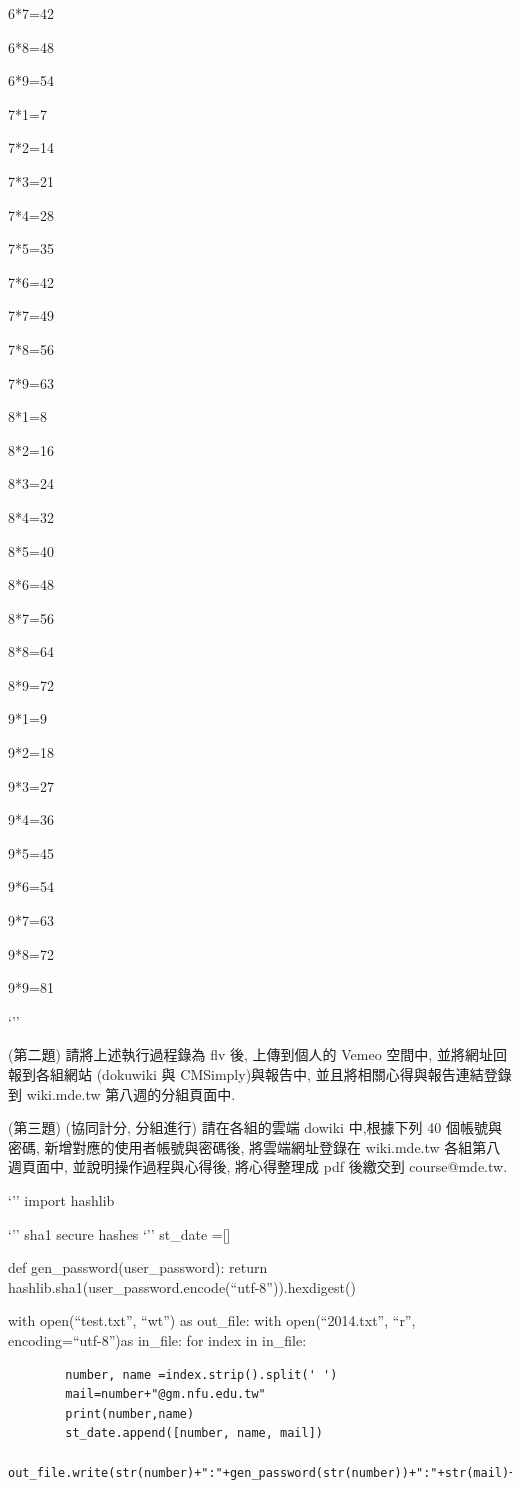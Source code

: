 \documentclass[]{article}
\begin{document}
6*7=42

6*8=48

6*9=54

7*1=7

7*2=14

7*3=21

7*4=28

7*5=35

7*6=42

7*7=49

7*8=56

7*9=63

8*1=8

8*2=16

8*3=24

8*4=32

8*5=40

8*6=48

8*7=56

8*8=64

8*9=72

9*1=9

9*2=18

9*3=27

9*4=36

9*5=45

9*6=54

9*7=63

9*8=72

9*9=81

`''

(第二題) 請將上述執行過程錄為 flv 後, 上傳到個人的 Vemeo 空間中,
並將網址回報到各組網站 (dokuwiki 與 CMSimply)與報告中,
並且將相關心得與報告連結登錄到 wiki.mde.tw 第八週的分組頁面中.

(第三題) (協同計分, 分組進行) 請在各組的雲端 dowiki 中,根據下列 40
個帳號與密碼, 新增對應的使用者帳號與密碼後, 將雲端網址登錄在 wiki.mde.tw
各組第八週頁面中, 並說明操作過程與心得後, 將心得整理成 pdf 後繳交到
course@mde.tw.

`'' import hashlib

`'' sha1 secure hashes `'' st\_date ={[}{]}

def gen\_password(user\_password): return
hashlib.sha1(user\_password.encode(``utf-8'')).hexdigest()

with open(``test.txt'', ``wt'') as out\_file: with open(``2014.txt'',
``r'', encoding=``utf-8'')as in\_file: for index in in\_file:

\begin{verbatim}
        number, name =index.strip().split(' ')
        mail=number+"@gm.nfu.edu.tw"
        print(number,name)
        st_date.append([number, name, mail])
        out_file.write(str(number)+":"+gen_password(str(number))+":"+str(mail)+":user"+"\n")
\end{verbatim}
\end{document}
